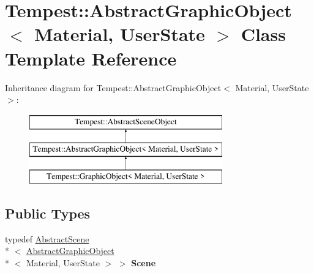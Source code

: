 \hypertarget{class_tempest_1_1_abstract_graphic_object}{\section{Tempest\+:\+:Abstract\+Graphic\+Object$<$ Material, User\+State $>$ Class Template Reference}
\label{class_tempest_1_1_abstract_graphic_object}
}
Inheritance diagram for Tempest\+:\+:Abstract\+Graphic\+Object$<$ Material, User\+State $>$\+:\begin{figure}[H]
\begin{center}
\leavevmode
\includegraphics[height=3.000000cm]{class_tempest_1_1_abstract_graphic_object}
\end{center}
\end{figure}
\subsection*{Public Types}
\begin{DoxyCompactItemize}
\item 
\hypertarget{class_tempest_1_1_abstract_graphic_object_ab5338e283ec5e877a1b2f0eaf61c9efd}{typedef \hyperlink{class_tempest_1_1_abstract_scene}{Abstract\+Scene}\\*
$<$ \hyperlink{class_tempest_1_1_abstract_graphic_object}{Abstract\+Graphic\+Object}\\*
$<$ Material, User\+State $>$ $>$ {\bfseries Scene}}\label{class_tempest_1_1_abstract_graphic_object_ab5338e283ec5e877a1b2f0eaf61c9efd}

\end{DoxyCompactItemize}
